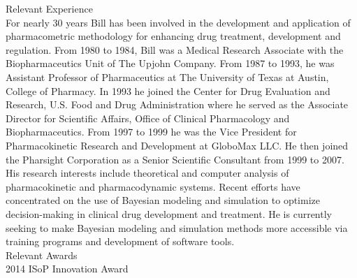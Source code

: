 \documentclass[11pt]{nih2016}
\begin{document}
\noindent
{\sc Relevant Experience}
\\[2pt]
For nearly 30 years Bill has been involved in the development and
application of pharmacometric methodology for enhancing drug
treatment, development and regulation. From 1980 to 1984, Bill was a
Medical Research Associate with the Biopharmaceutics Unit of The
Upjohn Company. From 1987 to 1993, he was Assistant Professor of
Pharmaceutics at The University of Texas at Austin, College of
Pharmacy. In 1993 he joined the Center for Drug Evaluation and
Research, U.S. Food and Drug Administration where he served as the
Associate Director for Scientific Affairs, Office of Clinical
Pharmacology and Biopharmaceutics. From 1997 to 1999 he was the Vice
President for Pharmacokinetic Research and Development at GloboMax
LLC. He then joined the Pharsight Corporation as a Senior Scientific
Consultant from 1999 to 2007. His research interests include
theoretical and computer analysis of pharmacokinetic and
pharmacodynamic systems. Recent efforts have concentrated on the use
of Bayesian modeling and simulation to optimize decision-making in
clinical drug development and treatment. He is currently seeking to
make Bayesian modeling and simulation methods more accessible via
training programs and development of software tools.
\\

\noindent
{\sc Relevant Awards}
\\[2pt]
2014 ISoP Innovation Award
\\
\end{document}
